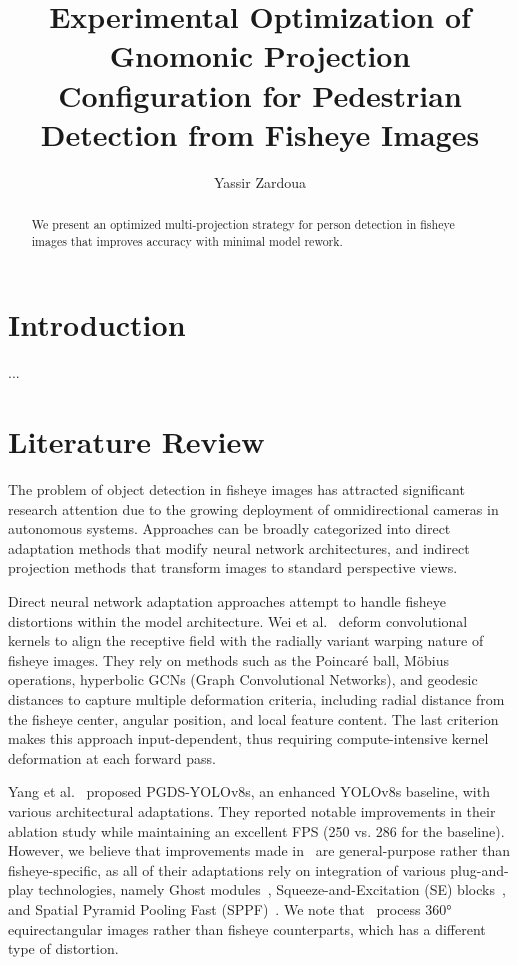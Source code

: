\documentclass[twocolumn]{svjour3}          %
\begin{document}
\sloppy %
\title{\centering Experimental Optimization of Gnomonic Projection Configuration for Pedestrian Detection from Fisheye Images}

\author{Yassir Zardoua}
\maketitle
\newpage

\begin{abstract}
	We present an optimized multi-projection strategy for person detection in fisheye images that improves accuracy with minimal model rework.
\end{abstract}

\section{Introduction}
...
\section{Literature Review}
\label{sec_literature}
\noindent
The problem of object detection in fisheye images has attracted significant research attention due to the growing deployment of omnidirectional cameras in autonomous systems. Approaches can be broadly categorized into direct adaptation methods that modify neural network architectures, and indirect projection methods that transform images to standard perspective views.

Direct neural network adaptation approaches attempt to handle fisheye distortions within the model architecture. Wei et al.~\cite{wei2023dcpb} deform convolutional kernels to align the receptive field with the radially variant warping nature of fisheye images. They rely on methods such as the Poincaré ball, Möbius operations, hyperbolic GCNs (Graph Convolutional Networks), and geodesic distances to capture multiple deformation criteria, including radial distance from the fisheye center, angular position, and local feature content. The last criterion makes this approach input-dependent, thus requiring compute-intensive kernel deformation at each forward pass.

Yang et al.~\cite{yang2024improved} proposed PGDS-YOLOv8s, an enhanced YOLOv8s baseline, with various architectural adaptations. They reported notable improvements in their ablation study while maintaining an excellent FPS (250 vs. 286 for the baseline). However, we believe that improvements made in~\cite{yang2024improved} are general-purpose rather than fisheye-specific, as all of their adaptations rely on integration of various plug-and-play technologies, namely Ghost modules~\cite{ghostnet}, Squeeze-and-Excitation (SE) blocks~\cite{squeeze_excitation_se}, and Spatial Pyramid Pooling Fast (SPPF)~\cite{yolov5_by_Ultralytics_2020}. We note that~\cite{yang2024improved} process 360° equirectangular images rather than fisheye counterparts, which has a different type of distortion. 
\end{document}
